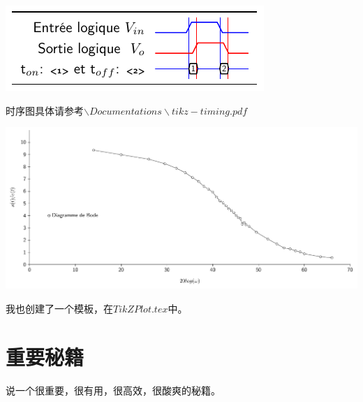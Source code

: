 \documentclass[12pt,a4paper,oneside]{book}
\begin{document}
{\begin{minipage}{\linewidth}
\makebox[\linewidth]{}
\centering
{}
\includegraphics[scale=1.3]{figures/tzt.pdf}
\label{pic:tzt}
\end{minipage}
时序图具体请参考$\backslash Documentations\backslash tikz-timing.pdf$
\par
\begin{minipage}{\linewidth}
\makebox[\linewidth]{}
\centering
{}
\includegraphics[scale=.6]{figures/tzp.pdf}
\label{pic:tzp}
\end{minipage}
我也创建了一个模板，在$TikZPlot.tex$中。



\chapter{重要秘籍}
说一个很重要，很有用，很高效，很酸爽的秘籍。

}
\end{document}
